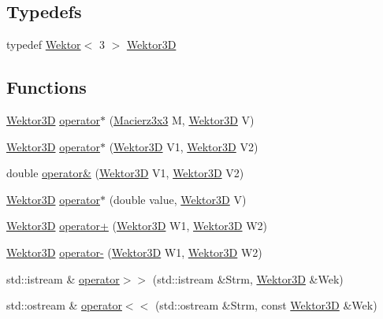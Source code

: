 \subsection*{Typedefs}
\begin{DoxyCompactItemize}
\item 
typedef \hyperlink{class_wektor}{Wektor}$<$ 3 $>$ \hyperlink{_wektor3_d_8hh_ac353a272b38b4ad342f7181ad7bdb91a}{Wektor3D}
\end{DoxyCompactItemize}
\subsection*{Functions}
\begin{DoxyCompactItemize}
\item 
\hyperlink{_wektor3_d_8hh_ac353a272b38b4ad342f7181ad7bdb91a}{Wektor3D} \hyperlink{_wektor3_d_8hh_a5441b11ac93c93e38a11a796d1855fe3}{operator$\ast$} (\hyperlink{_macierz3x3_8hh_ad4fc7b0e263d9a99ba6174f68b52ea87}{Macierz3x3} M, \hyperlink{_wektor3_d_8hh_ac353a272b38b4ad342f7181ad7bdb91a}{Wektor3D} V)
\item 
\hyperlink{_wektor3_d_8hh_ac353a272b38b4ad342f7181ad7bdb91a}{Wektor3D} \hyperlink{_wektor3_d_8hh_a11c35b770aab1dd49984861ed1d351d4}{operator$\ast$} (\hyperlink{_wektor3_d_8hh_ac353a272b38b4ad342f7181ad7bdb91a}{Wektor3D} V1, \hyperlink{_wektor3_d_8hh_ac353a272b38b4ad342f7181ad7bdb91a}{Wektor3D} V2)
\item 
double \hyperlink{_wektor3_d_8hh_ac3cbaa36ffda58b46bbaa95b99fde093}{operator\&} (\hyperlink{_wektor3_d_8hh_ac353a272b38b4ad342f7181ad7bdb91a}{Wektor3D} V1, \hyperlink{_wektor3_d_8hh_ac353a272b38b4ad342f7181ad7bdb91a}{Wektor3D} V2)
\item 
\hyperlink{_wektor3_d_8hh_ac353a272b38b4ad342f7181ad7bdb91a}{Wektor3D} \hyperlink{_wektor3_d_8hh_a13099aac77d6145b462434c84f6b8509}{operator$\ast$} (double value, \hyperlink{_wektor3_d_8hh_ac353a272b38b4ad342f7181ad7bdb91a}{Wektor3D} V)
\item 
\hyperlink{_wektor3_d_8hh_ac353a272b38b4ad342f7181ad7bdb91a}{Wektor3D} \hyperlink{_wektor3_d_8hh_a1de808fbd72c8b788a0a88ac119b8a81}{operator+} (\hyperlink{_wektor3_d_8hh_ac353a272b38b4ad342f7181ad7bdb91a}{Wektor3D} W1, \hyperlink{_wektor3_d_8hh_ac353a272b38b4ad342f7181ad7bdb91a}{Wektor3D} W2)
\item 
\hyperlink{_wektor3_d_8hh_ac353a272b38b4ad342f7181ad7bdb91a}{Wektor3D} \hyperlink{_wektor3_d_8hh_a71e2010b0b6abfb4e8a6507eb5c9ebe5}{operator-\/} (\hyperlink{_wektor3_d_8hh_ac353a272b38b4ad342f7181ad7bdb91a}{Wektor3D} W1, \hyperlink{_wektor3_d_8hh_ac353a272b38b4ad342f7181ad7bdb91a}{Wektor3D} W2)
\item 
std\+::istream \& \hyperlink{_wektor3_d_8hh_a1075392800748e0563d8b2c02640a458}{operator$>$$>$} (std\+::istream \&Strm, \hyperlink{_wektor3_d_8hh_ac353a272b38b4ad342f7181ad7bdb91a}{Wektor3D} \&Wek)
\item 
std\+::ostream \& \hyperlink{_wektor3_d_8hh_a55d3a49ea2a060a1d4712feb3811e68e}{operator$<$$<$} (std\+::ostream \&Strm, const \hyperlink{_wektor3_d_8hh_ac353a272b38b4ad342f7181ad7bdb91a}{Wektor3D} \&Wek)
\end{DoxyCompactItemize}


